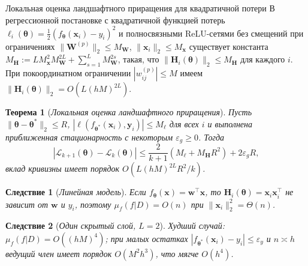 \documentclass[10pt,pdf,hyperref={unicode}]{beamer}
\newtheorem{rustheorem}{Теорема}
\newtheorem{ruscorollary}{Следствие}
\begin{document}
\begin{frame}{Локальная оценка ландшафтного приращения для квадратичной потери}
\justifying
\footnotesize
В регрессионной постановке с квадратичной функцией потерь $\ell_i(\boldsymbol{\theta})=\frac{1}{2}(f_{\boldsymbol{\theta}}(\mathbf{x}_i)-y_i)^2$ и полносвязными ReLU-сетями без смещений при ограничениях $\|\mathbf{W}^{(p)}\|_2\le M_{\mathbf{W}}$, $\|\mathbf{x}_i\|_2\le M_{\mathbf{x}}$ существует константа $M_{\mathbf{H}}:=L M_{\mathbf{x}}^2 M_{\mathbf{W}}^{2L}+\sum_{s=1}^{L}M_{\mathbf{W}}^{2s}$, такая, что $\|\mathbf{H}_i(\boldsymbol{\theta})\|_2\le M_{\mathbf{H}}$ для каждого $i$. При покоординатном ограничении $|w_{ij}^{(p)}|\le M$ имеем $\|\mathbf{H}_i(\boldsymbol{\theta})\|_2=O(L(hM)^{2L})$.

\begin{rustheorem}[\emph{Локальная оценка ландшафтного приращения}]
    \justifying
    Пусть $\|\boldsymbol{\theta}-\boldsymbol{\theta}^*\|_2\le R$, $|\ell(f_{\boldsymbol{\theta}^*}(\mathbf{x}_i),\mathbf{y}_i)|\le M_{\ell}$ для всех $i$ и выполнена приближенная стационарность с некоторым $\varepsilon_g\ge0$. Тогда
    \[
        |\mathcal{L}_{k+1}(\boldsymbol{\theta})-\mathcal{L}_k(\boldsymbol{\theta})|\le\frac{2}{k+1}(M_{\ell}+M_{\mathbf{H}}R^2)+2\varepsilon_g R,
    \]
    вклад кривизны имеет порядок $O(L(hM)^{2L}R^2/k)$.
\end{rustheorem}

\begin{ruscorollary}[\emph{Линейная модель}]
    \justifying
    Если $f_{\boldsymbol{\theta}}(\mathbf{x})=\mathbf{w}^{\top}\mathbf{x}$, то $\mathbf{H}_i(\boldsymbol{\theta})=\mathbf{x}_i\mathbf{x}_i^{\top}$ не зависит от $\mathbf{w}$ и $y_i$, поэтому $\mu_f(f|D)=O(n)$ при $\|\mathbf{x}_i\|_2^2=\Theta(n)$.
\end{ruscorollary}

\begin{ruscorollary}[\emph{Один скрытый слой, $L=2$}]
    \justifying
    Худший случай: $\mu_f(f|D)=O((hM)^4)$; при малых остатках $|f_{\boldsymbol{\theta}^*}(\mathbf{x}_i)-y_i|\le\varepsilon_y$ и $n\asymp h$ ведущий член имеет порядок $O(M^2h^3)$, что мягче $O(h^4)$.
\end{ruscorollary}
\end{frame}
\end{document}

